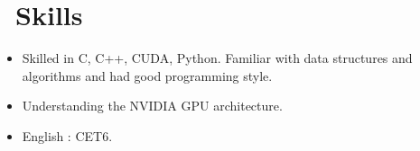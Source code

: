 \documentclass{resume}
\begin{document}
\section{\faCogs\ Skills}
\begin{itemize}[parsep=0.5ex]
  \item Skilled in C, C++, CUDA, Python. Familiar with data structures and algorithms and had good programming style.
  \item Understanding the NVIDIA GPU architecture.
  \item English : CET6.
\end{itemize}
\end{document}
